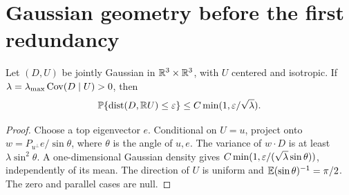 \section{Gaussian geometry before the first redundancy}\label{sec:geometry}

\begin{lemma}\label{lem:smallball}
Let $(D,U)$ be jointly Gaussian in $\mathbb R^3\times\mathbb R^3$, with $U$ centered
and isotropic. If $\lambda=\lambda_{\max}\operatorname{Cov}(D\mid U)>0$, then
\[
 \mathbb P\{\operatorname{dist}(D,\mathbb R U)\leq\varepsilon\}
       \leq C\min(1,\varepsilon/\sqrt\lambda).
\]
\end{lemma}
\begin{proof}
Choose a top eigenvector $e$. Conditional on $U=u$, project onto
$w=P_{u^\perp}e/\sin\theta$, where $\theta$ is the angle of $u,e$.
The variance of $w\cdot D$ is at least $\lambda\sin^2\theta$.
A one-dimensional Gaussian density gives
$C\min(1,\varepsilon/(\sqrt\lambda\sin\theta))$, independently of its mean.
The direction of $U$ is uniform and $\mathbb E(\sin\theta)^{-1}=\pi/2$.
The zero and parallel cases are null.
\end{proof}

